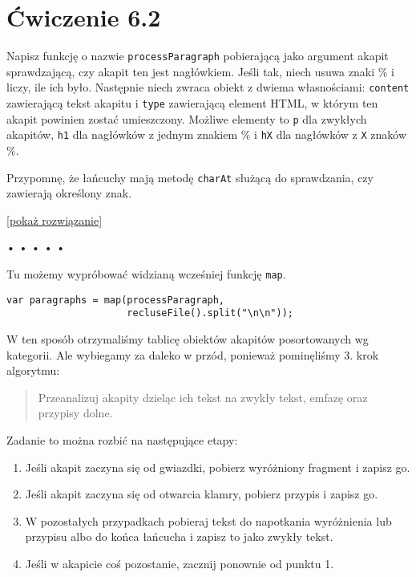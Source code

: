   
\section*{Ćwiczenie 6.2}
\label{sec:6.2}
  
    
Napisz funkcję o nazwie \texttt{processParagraph} pobierającą jako argument akapit sprawdzającą, czy akapit ten jest nagłówkiem. Jeśli tak, niech usuwa znaki \% i liczy, ile ich było. Następnie niech zwraca obiekt z dwiema własnościami: \texttt{content} zawierającą tekst akapitu i \texttt{type} zawierającą element HTML, w którym ten akapit powinien zostać umieszczony. Możliwe elementy to \texttt{p} dla zwykłych akapitów, \texttt{h1} dla nagłówków z jednym znakiem \% i \texttt{hX} dla nagłówków z \texttt{X} znaków \%.

    
Przypomnę, że łańcuchy mają metodę \texttt{charAt} służącą do sprawdzania, czy zawierają określony znak.

  
[\hyperref[sol:6.2]{pokaż rozwiązanie}]
  


\begin{center}
• • • • •
\end{center}

  
Tu możemy wypróbować widzianą wcześniej funkcję \texttt{map}.

  
\begin{verbatim} 
var paragraphs = map(processParagraph,
                     recluseFile().split("\n\n"));
 \end{verbatim}
  
W ten sposób otrzymaliśmy tablicę obiektów akapitów posortowanych wg kategorii. Ale wybiegamy za daleko w przód, ponieważ pominęliśmy 3. krok algorytmu:

  
\begin{quotation}
Przeanalizuj akapity dzieląc ich tekst na zwykły tekst, emfazę oraz przypisy dolne.
\end{quotation}
  
\noindent
Zadanie to można rozbić na następujące etapy:

  \begin{enumerate}
    \item Jeśli akapit zaczyna się od gwiazdki, pobierz wyróżniony fragment i zapisz go.
    \item Jeśli akapit zaczyna się od otwarcia klamry, pobierz przypis i zapisz go.
    \item W pozostałych przypadkach pobieraj tekst do napotkania wyróżnienia lub przypisu albo do końca łańcucha i zapisz to jako zwykły tekst.
    \item Jeśli w akapicie coś pozostanie, zacznij ponownie od punktu 1.
  \end{enumerate}


